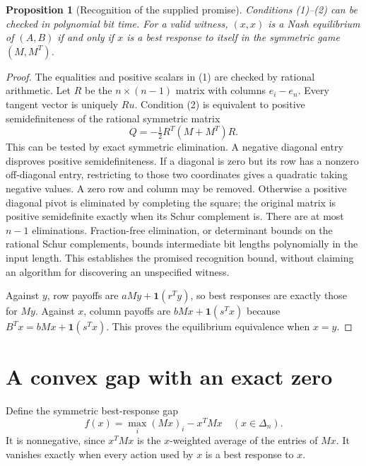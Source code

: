 \documentclass[11pt]{article}
\newtheorem{proposition}[theorem]{Proposition}
\theoremstyle{remark}\newtheorem{remark}[theorem]{Remark}
\begin{document}
\begin{proposition}[Recognition of the supplied promise]
Conditions (1)--(2) can be checked in polynomial bit time. For a valid witness, $(x,x)$ is a Nash equilibrium of $(A,B)$ if and only if $x$ is a best response to itself in the symmetric game $(M,M^T)$.
\end{proposition}
\begin{proof}
The equalities and positive scalars in (1) are checked by rational arithmetic. Let $R$ be the $n\times(n-1)$ matrix with columns $e_i-e_n$. Every tangent vector is uniquely $Ru$. Condition (2) is equivalent to positive semidefiniteness of the rational symmetric matrix
\[
 Q=-\tfrac12 R^T(M+M^T)R.
\]
This can be tested by exact symmetric elimination. A negative diagonal entry disproves positive semidefiniteness. If a diagonal is zero but its row has a nonzero off-diagonal entry, restricting to those two coordinates gives a quadratic taking negative values. A zero row and column may be removed. Otherwise a positive diagonal pivot is eliminated by completing the square; the original matrix is positive semidefinite exactly when its Schur complement is. There are at most $n-1$ eliminations. Fraction-free elimination, or determinant bounds on the rational Schur complements, bounds intermediate bit lengths polynomially in the input length. This establishes the promised recognition bound, without claiming an algorithm for discovering an unspecified witness.

Against $y$, row payoffs are $aMy+\mathbf1(r^Ty)$, so best responses are exactly those for $My$. Against $x$, column payoffs are $bMx+\mathbf1(s^Tx)$ because $B^Tx=bMx+\mathbf1(s^Tx)$. This proves the equilibrium equivalence when $x=y$.
\end{proof}

\section*{A convex gap with an exact zero}
Define the symmetric best-response gap
\[
 f(x)=\max_i(Mx)_i-x^TMx\quad(x\in\Delta_n).
 \tag{3}
\]
It is nonnegative, since $x^TMx$ is the $x$-weighted average of the entries of $Mx$. It vanishes exactly when every action used by $x$ is a best response to $x$.
\end{document}
